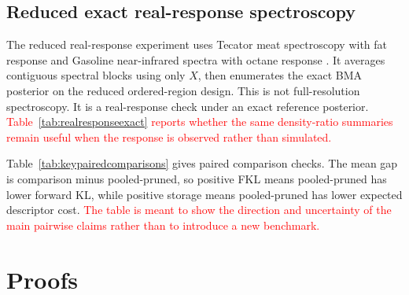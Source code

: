 \documentclass[twoside,11pt]{article}
\newcommand{\rev}[1]{\textcolor{red}{#1}}
\begin{document}
\begin{table}[!htbp]
\centering
\scriptsize

\caption{Saved-draw \(p=100\) compression check.}
\label{tab:mainadaptivep100}
\end{table}

\subsection{Reduced exact real-response spectroscopy}
\label{subsec:realresponsereduced}

The reduced real-response experiment uses Tecator meat spectroscopy with fat response and Gasoline near-infrared spectra with octane response \citep{thodberg1993,liland2026pls}. It averages contiguous spectral blocks using only \(X\), then enumerates the exact BMA posterior on the reduced ordered-region design. This is not full-resolution spectroscopy. It is a real-response check under an exact reference posterior. \rev{Table~\ref{tab:realresponseexact} reports whether the same density-ratio summaries remain useful when the response is observed rather than simulated.}

\begin{table}[!htbp]
\centering
\scriptsize

\caption{Reduced exact real-response spectroscopy benchmark. \rev{The design is reduced before enumeration, so the table is an exact real-response check rather than a full-resolution spectroscopy analysis.}}
\label{tab:realresponseexact}
\end{table}

Table~\ref{tab:keypairedcomparisons} gives paired comparison checks. The mean gap is comparison minus pooled-pruned, so positive FKL means pooled-pruned has lower forward KL, while positive storage means pooled-pruned has lower expected descriptor cost. \rev{The table is meant to show the direction and uncertainty of the main pairwise claims rather than to introduce a new benchmark.}

\begin{table}[!htbp]
\centering
\footnotesize

\caption{Paired comparison checks.}
\label{tab:keypairedcomparisons}
\end{table}

\section{Proofs}
\end{document}
